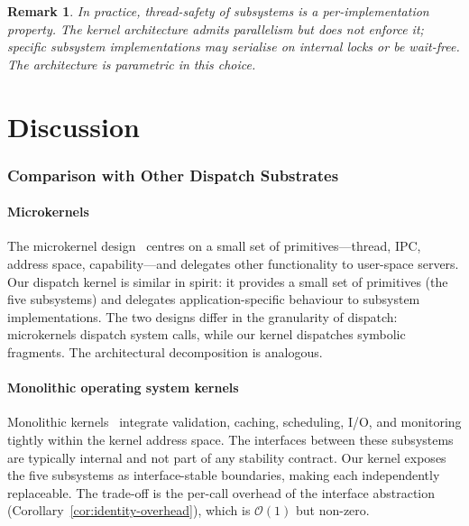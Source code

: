 \documentclass[twocolumn,11pt,a4paper]{article}
\newtheorem{remark}[theorem]{Remark}
\begin{document}
\begin{remark}
In practice, thread-safety of subsystems is a per-implementation property. The kernel architecture admits parallelism but does not enforce it; specific subsystem implementations may serialise on internal locks or be wait-free. The architecture is parametric in this choice.
\end{remark}

\part{Discussion}

\section{Comparison with Other Dispatch Substrates}
\label{sec:comparison}

\subsection{Microkernels}

The microkernel design~\citep{liedtke1995microkernel,klein2009sel4} centres on a small set of primitives---thread, IPC, address space, capability---and delegates other functionality to user-space servers. Our dispatch kernel is similar in spirit: it provides a small set of primitives (the five subsystems) and delegates application-specific behaviour to subsystem implementations. The two designs differ in the granularity of dispatch: microkernels dispatch system calls, while our kernel dispatches symbolic fragments. The architectural decomposition is analogous.

\subsection{Monolithic operating system kernels}

Monolithic kernels~\citep{tanenbaum2014modern} integrate validation, caching, scheduling, I/O, and monitoring tightly within the kernel address space. The interfaces between these subsystems are typically internal and not part of any stability contract. Our kernel exposes the five subsystems as interface-stable boundaries, making each independently replaceable. The trade-off is the per-call overhead of the interface abstraction (Corollary~\ref{cor:identity-overhead}), which is $\mathcal{O}(1)$ but non-zero.
\end{document}
